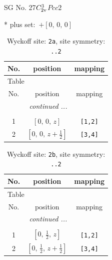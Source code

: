 \documentclass[fleqn,8pt]{jsarticle}
\begin{document}
\setcounter{MaxMatrixCols}{32}

\renewcommand{\tablename}{Table~}
\renewcommand{\figurename}{Figure~}
\begin{center}
\LARGE
SG No. 27\quad$C_{\rm 2v}^{3}$\quad$Pcc2$\quad[ orthorhombic ]
\end{center}
* plus set:\,\,\,$+\left[ 0,\, 0,\, 0 \right]$
\renewcommand{\arraystretch}{1.2}
\begin{longtable}{ccc}
\caption{Wyckoff site: {\tt 2a}, site symmetry: {\tt ..2}}
 \\
 \hline \hline
No. & position & mapping \\ \hline \endfirsthead

\multicolumn{2}{l}{\tablename\ \thetable{}} \\
 \hline \hline
No. & position & mapping \\ \hline \endhead

 \hline \hline
\multicolumn{2}{r}{\footnotesize\it continued ...} \\ \endfoot

 \hline \hline
\multicolumn{2}{r}{} \\ \endlastfoot

1 & $\left[ 0,\, 0,\, z \right]$ & {\tt [1,2]} \\ \hline
2 & $\left[ 0,\, 0,\, z + \frac{1}{2} \right]$ & {\tt [3,4]} \\
\end{longtable}
\renewcommand{\arraystretch}{1.2}
\begin{longtable}{ccc}
\caption{Wyckoff site: {\tt 2b}, site symmetry: {\tt ..2}}
 \\
 \hline \hline
No. & position & mapping \\ \hline \endfirsthead

\multicolumn{2}{l}{\tablename\ \thetable{}} \\
 \hline \hline
No. & position & mapping \\ \hline \endhead

 \hline \hline
\multicolumn{2}{r}{\footnotesize\it continued ...} \\ \endfoot

 \hline \hline
\multicolumn{2}{r}{} \\ \endlastfoot

1 & $\left[ 0,\, \frac{1}{2},\, z \right]$ & {\tt [1,2]} \\ \hline
2 & $\left[ 0,\, \frac{1}{2},\, z + \frac{1}{2} \right]$ & {\tt [3,4]} \\
\end{longtable}
\end{document}
